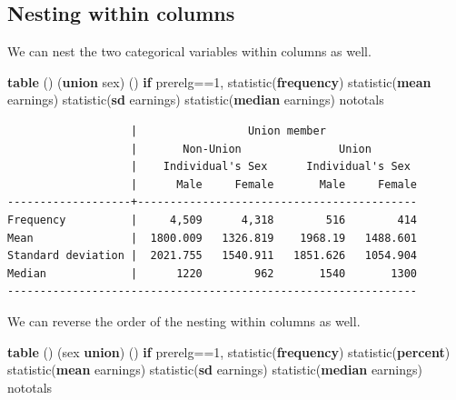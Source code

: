 \documentclass[
]{book}
\newenvironment{Shaded}{\begin{snugshade}}{\end{snugshade}}
\newcommand{\FunctionTok}[1]{\textcolor[rgb]{0.13,0.29,0.53}{\textbf{#1}}}
\newcommand{\KeywordTok}[1]{\textcolor[rgb]{0.13,0.29,0.53}{\textbf{#1}}}
\newcommand{\NormalTok}[1]{#1}
\begin{document}
\subsection{Nesting within columns}\label{nesting-within-columns}

We can nest the two categorical variables within columns as well.

\begin{Shaded}
\begin{Highlighting}[]
\KeywordTok{table}\NormalTok{ () (}\KeywordTok{union}\NormalTok{ sex) () }\KeywordTok{if}\NormalTok{ prerelg==1, statistic(}\KeywordTok{frequency}\NormalTok{) statistic(}\KeywordTok{mean}\NormalTok{ earnings) statistic(}\FunctionTok{sd}\NormalTok{ earnings) statistic(}\KeywordTok{median}\NormalTok{ earnings) nototals}
\end{Highlighting}
\end{Shaded}

\begin{verbatim}
                   |                 Union member              
                   |       Non-Union               Union       
                   |    Individual's Sex      Individual's Sex 
                   |      Male     Female       Male     Female
-------------------+-------------------------------------------
Frequency          |     4,509      4,318        516        414
Mean               |  1800.009   1326.819    1968.19   1488.601
Standard deviation |  2021.755   1540.911   1851.626   1054.904
Median             |      1220        962       1540       1300
---------------------------------------------------------------
\end{verbatim}

We can reverse the order of the nesting within columns as well.

\begin{Shaded}
\begin{Highlighting}[]
\KeywordTok{table}\NormalTok{ () (sex }\KeywordTok{union}\NormalTok{) () }\KeywordTok{if}\NormalTok{ prerelg==1, statistic(}\KeywordTok{frequency}\NormalTok{) statistic(}\KeywordTok{percent}\NormalTok{) statistic(}\KeywordTok{mean}\NormalTok{ earnings) statistic(}\FunctionTok{sd}\NormalTok{ earnings) statistic(}\KeywordTok{median}\NormalTok{ earnings) nototals}
\end{Highlighting}
\end{Shaded}
\end{document}
